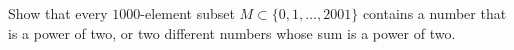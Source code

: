 Show that every $1000$-element subset $M \subset \{0, 1, \ldots, 2001 \}$ contains a number that
is a power of two, or two different numbers whose sum is a power of two.
